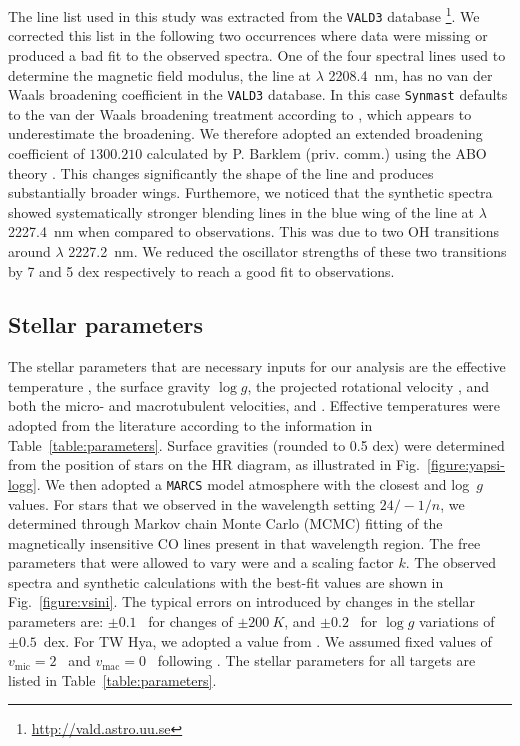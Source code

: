 \documentclass{aa}
\begin{document}
The line list used in this study was extracted from the {\tt VALD3} database \citep{vald2015}\footnote{\url{http://vald.astro.uu.se}}. We corrected this list in the following two occurrences where data were missing or produced a bad fit to the observed spectra. One of the four spectral lines used to determine the magnetic field modulus, the  line at $\lambda$ 2208.4~nm, has no van der Waals broadening coefficient in the {\tt VALD3} database. In this case {\tt Synmast} defaults to the van der Waals broadening treatment according to \citet{1992oasp.book.....G}, which appears to underestimate the broadening. We therefore adopted an extended broadening coefficient of $1300.210$ calculated by P. Barklem (priv. comm.) using the ABO theory \citep{1995MNRAS.276..859A,1997MNRAS.290..102B}. This changes significantly the shape of the  line and produces substantially broader wings. Furthemore, we noticed that the synthetic spectra showed systematically stronger blending lines in the blue wing of the  line at $\lambda$ 2227.4~nm when compared to observations. This was due to two OH transitions around $\lambda$ 2227.2~nm. We reduced the oscillator strengths of these two transitions by 7 and 5 dex respectively to reach a good fit to observations.

\subsection{Stellar parameters}
\label{subsection:stellar-parameters}
The stellar parameters that are necessary inputs for our analysis are the effective temperature {\teff}, the surface gravity $\log g$, the projected rotational velocity {\vsini}, and both the micro- and macrotubulent velocities, {\vmic} and {\vmac}. Effective temperatures were adopted from the literature according to the information in Table~\ref{table:parameters}. Surface gravities (rounded to 0.5 dex) were determined from the position of stars on the HR diagram, as illustrated in Fig.~\ref{figure:yapsi-logg}. We then adopted a {\tt MARCS} model atmosphere with the closest {\teff} and log~$g$ values. For stars that we observed in the wavelength setting $24/-1/n$, we determined {\vsini} through Markov chain Monte Carlo (MCMC) fitting of the magnetically insensitive CO lines present in that wavelength region. The free parameters that were allowed to vary were {\vsini} and a scaling factor $k$. The observed spectra and synthetic calculations with the best-fit {\vsini} values are shown in Fig.~\ref{figure:vsini}. The typical errors on {\vsini} introduced by changes in the stellar parameters are: $\pm 0.1$~{\kms} for {\teff} changes of $\pm 200~K$, and $\pm 0.2$~{\kms} for $\log g$ variations of $\pm 0.5$~dex. For TW Hya, we adopted a {\vsini} value from \citet{2011donati-twhya}. We assumed fixed values of $v_{\text{mic}} = 2$~{\kms} and $v_{\text{mac}} = 0$~{\kms} following \citet{2017A&A...608A..77L}. The stellar parameters for all targets are listed in Table~\ref{table:parameters}.
\end{document}
